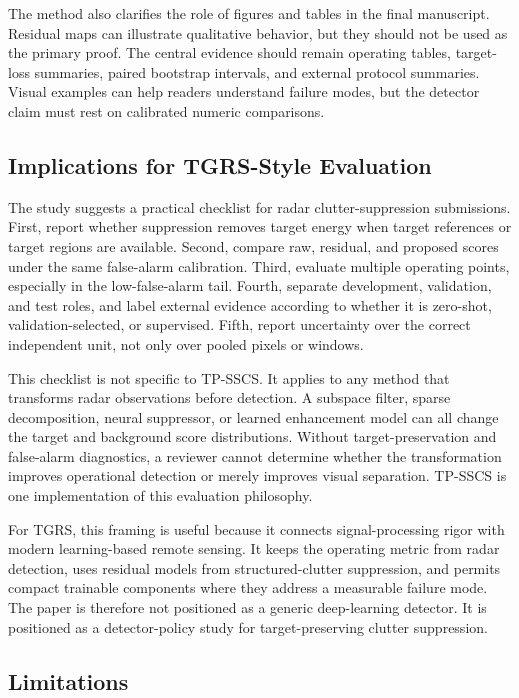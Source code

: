 \documentclass[journal]{IEEEtran}
\begin{document}
The method also clarifies the role of figures and tables in the final manuscript. Residual maps can illustrate qualitative behavior, but they should not be used as the primary proof. The central evidence should remain operating tables, target-loss summaries, paired bootstrap intervals, and external protocol summaries. Visual examples can help readers understand failure modes, but the detector claim must rest on calibrated numeric comparisons.

\subsection{Implications for TGRS-Style Evaluation}

The study suggests a practical checklist for radar clutter-suppression submissions. First, report whether suppression removes target energy when target references or target regions are available. Second, compare raw, residual, and proposed scores under the same false-alarm calibration. Third, evaluate multiple operating points, especially in the low-false-alarm tail. Fourth, separate development, validation, and test roles, and label external evidence according to whether it is zero-shot, validation-selected, or supervised. Fifth, report uncertainty over the correct independent unit, not only over pooled pixels or windows.

This checklist is not specific to TP-SSCS. It applies to any method that transforms radar observations before detection. A subspace filter, sparse decomposition, neural suppressor, or learned enhancement model can all change the target and background score distributions. Without target-preservation and false-alarm diagnostics, a reviewer cannot determine whether the transformation improves operational detection or merely improves visual separation. TP-SSCS is one implementation of this evaluation philosophy.

For TGRS, this framing is useful because it connects signal-processing rigor with modern learning-based remote sensing. It keeps the operating metric from radar detection, uses residual models from structured-clutter suppression, and permits compact trainable components where they address a measurable failure mode. The paper is therefore not positioned as a generic deep-learning detector. It is positioned as a detector-policy study for target-preserving clutter suppression.

\subsection{Limitations}
\end{document}
